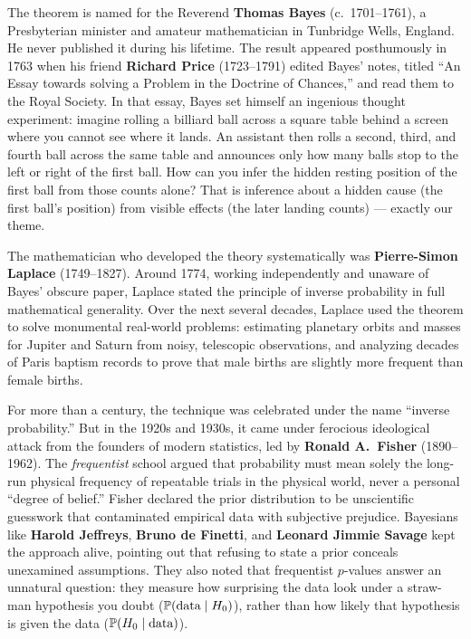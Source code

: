 \begin{historybox}
The theorem is named for the Reverend \textbf{Thomas Bayes} (c.\ 1701--1761), a
Presbyterian minister and amateur mathematician in Tunbridge Wells, England. He never
published it during his lifetime. The result appeared posthumously in 1763 when his
friend \textbf{Richard Price} (1723--1791) edited Bayes' notes, titled ``An Essay towards
solving a Problem in the Doctrine of Chances,'' and read them to the Royal Society. In
that essay, Bayes set himself an ingenious thought experiment: imagine rolling a billiard
ball across a square table behind a screen where you cannot see where it lands. An assistant
then rolls a second, third, and fourth ball across the same table and announces only how
many balls stop to the left or right of the first ball. How can you infer the hidden
resting position of the first ball from those counts alone? That is inference about a
hidden cause (the first ball's position) from visible effects (the later landing counts)
--- exactly our theme.

The mathematician who developed the theory systematically was \textbf{Pierre-Simon Laplace}
(1749--1827). Around 1774, working independently and unaware of Bayes' obscure paper,
Laplace stated the principle of inverse probability in full mathematical generality. Over
the next several decades, Laplace used the theorem to solve monumental real-world
problems: estimating planetary orbits and masses for Jupiter and Saturn from noisy,
telescopic observations, and analyzing decades of Paris baptism records to prove that
male births are slightly more frequent than female births.

For more than a century, the technique was celebrated under the name ``inverse
probability.'' But in the 1920s and 1930s, it came under ferocious ideological attack from
the founders of modern statistics, led by \textbf{Ronald A.\ Fisher} (1890--1962). The
\emph{frequentist} school argued that probability must mean solely the long-run physical
frequency of repeatable trials in the physical world, never a personal ``degree of
belief.'' Fisher declared the prior distribution to be unscientific guesswork that
contaminated empirical data with subjective prejudice. Bayesians like \textbf{Harold
Jeffreys}, \textbf{Bruno de Finetti}, and \textbf{Leonard Jimmie Savage} kept the approach
alive, pointing out that refusing to state a prior conceals unexamined assumptions.
They also noted that frequentist $p$-values answer an unnatural question: they measure how
surprising the data look under a straw-man hypothesis you doubt ($\operatorname{\mathbb{P}}(\text{data}
\mid H_0)$), rather than how likely that hypothesis is given the data
($\operatorname{\mathbb{P}}(H_0 \mid \text{data})$).


\end{historybox}
